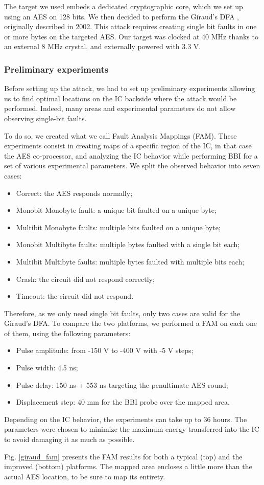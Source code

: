 		The target we used embeds a dedicated cryptographic core, which we set up using an AES on 128 bits.
		We then decided to perform the Giraud's DFA \cite{giraudDfa}, originally described in 2002.
		This attack requires creating single bit faults in one or more bytes on the targeted AES.
		Our target was clocked at 40 MHz thanks to an external 8 MHz crystal, and externally powered with 3.3 V.

		\subsubsection{Preliminary experiments}
			Before setting up the attack, we had to set up preliminary experiments allowing us to find optimal locations on the IC backside where the attack would be performed.
			Indeed, many areas and experimental parameters do not allow observing single-bit faults.
			
			To do so, we created what we call Fault Analysis Mappings (FAM).
			These experiments consist in creating maps of a specific region of the IC, in that case the AES co-processor, and analyzing the IC behavior while performing BBI for a set of various experimental parameters.
			We split the observed behavior into seven cases:
			\begin{itemize}
				\item Correct: the AES responds normally;
				\item Monobit Monobyte fault: a unique bit faulted on a unique byte;
				\item Multibit Monobyte faults: multiple bits faulted on a unique byte;
				\item Monobit Multibyte faults: multiple bytes faulted with a single bit each;
				\item Multibit Multibyte faults: multiple bytes faulted with multiple bits each;
				\item Crash: the circuit did not respond correctly;
				\item Timeout: the circuit did not respond.
			\end{itemize}
			Therefore, as we only need single bit faults, only two cases are valid for the Giraud's DFA.
			To compare the two platforms, we performed a FAM on each one of them, using the following parameters:
			\begin{itemize}
				\item Pulse amplitude: from -150 V to -400 V with -5 V steps;
				\item Pulse width: 4.5 ns;
				\item Pulse delay: 150 ns + 553 ns targeting the penultimate AES round;
				\item Displacement step: 40 mm for the BBI probe over the mapped area.
			\end{itemize}
			Depending on the IC behavior, the experiments can take up to 36 hours.
			The parameters were chosen to minimize the maximum energy transferred into the IC to avoid damaging it as much as possible.
			
			Fig. \ref{giraud_fam} presents the FAM results for both a typical (top) and the improved (bottom) platforms.
			The mapped area encloses a little more than the actual AES location, to be sure to map its entirety.

